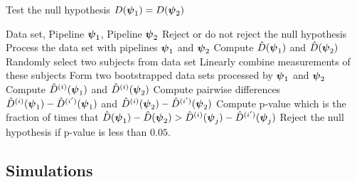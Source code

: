 \documentclass{article}
\begin{document}
\begin{algorithm}                      %
	\caption{Test the null hypothesis $D(\boldsymbol{\psi}_1) = D(\boldsymbol{\psi}_2)$}          %
	\label{alg:1}                           %
	\begin{algorithmic}                    %
		\REQUIRE Data set, Pipeline $\boldsymbol{\psi}_1$, Pipeline $\boldsymbol{\psi}_2$
		\ENSURE Reject or do not reject the null hypothesis
		\STATE Process the data set with pipelines $\boldsymbol{\psi}_1$ and $\boldsymbol{\psi}_2$
		\STATE Compute $\hat{D}(\boldsymbol{\psi}_1)$ and $\hat{D}(\boldsymbol{\psi}_2)$
					\STATE Randomly select two subjects from data set 
					\STATE Linearly combine measurements of these subjects
				\ENDFOR
				\STATE Form two bootstrapped data sets processed by $\boldsymbol{\psi}_1$ and $\boldsymbol{\psi}_2$
				\STATE Compute $\hat{D}^{(i)}(\boldsymbol{\psi}_1)$ and $\hat{D}^{(i)}(\boldsymbol{\psi}_2)$
		\ENDFOR
		\STATE Compute pairwise differences $\hat{D}^{(i)}(\boldsymbol{\psi}_1)-\hat{D}^{(i')}(\boldsymbol{\psi}_1)$ and $\hat{D}^{(i)}(\boldsymbol{\psi}_2)-\hat{D}^{(i')}(\boldsymbol{\psi}_2)$
		\STATE Compute p-value which is the fraction of times that $\hat{D}(\boldsymbol{\psi}_1)-\hat{D}(\boldsymbol{\psi}_2)>\hat{D}^{(i)}(\boldsymbol{\psi}_j)-\hat{D}^{(i')}(\boldsymbol{\psi}_j)$ 
		\STATE Reject the null hypothesis if p-value is less than $0.05$.
	\end{algorithmic}
\end{algorithm}

\subsection{Simulations}
\end{document}
